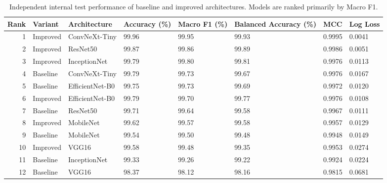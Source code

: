 \begin{table}
\caption{Independent internal test performance of baseline and improved architectures. Models are ranked primarily by Macro F1.}
\label{tab:internal_model_ranking}
\begin{tabular}{rlllllll}
\toprule
Rank & Variant & Architecture & Accuracy (\%) & Macro F1 (\%) & Balanced Accuracy (\%) & MCC & Log Loss \\
\midrule
1 & Improved & ConvNeXt-Tiny & 99.96 & 99.95 & 99.93 & 0.9995 & 0.0041 \\
2 & Improved & ResNet50 & 99.87 & 99.86 & 99.89 & 0.9986 & 0.0051 \\
3 & Improved & InceptionNet & 99.79 & 99.80 & 99.81 & 0.9976 & 0.0113 \\
4 & Baseline & ConvNeXt-Tiny & 99.79 & 99.73 & 99.67 & 0.9976 & 0.0167 \\
5 & Baseline & EfficientNet-B0 & 99.75 & 99.73 & 99.69 & 0.9972 & 0.0120 \\
6 & Improved & EfficientNet-B0 & 99.79 & 99.70 & 99.77 & 0.9976 & 0.0108 \\
7 & Baseline & ResNet50 & 99.71 & 99.64 & 99.58 & 0.9967 & 0.0111 \\
8 & Improved & MobileNet & 99.62 & 99.57 & 99.58 & 0.9957 & 0.0129 \\
9 & Baseline & MobileNet & 99.54 & 99.50 & 99.48 & 0.9948 & 0.0149 \\
10 & Improved & VGG16 & 99.58 & 99.48 & 99.35 & 0.9953 & 0.0274 \\
11 & Baseline & InceptionNet & 99.33 & 99.26 & 99.22 & 0.9924 & 0.0224 \\
12 & Baseline & VGG16 & 98.37 & 98.12 & 98.16 & 0.9815 & 0.0681 \\
\bottomrule
\end{tabular}
\end{table}
